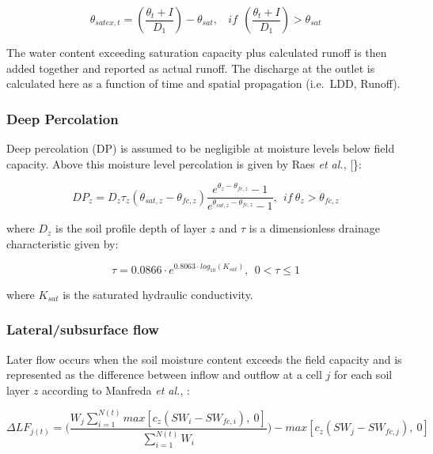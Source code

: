 \documentclass[]{article}
\begin{document}
\begin{equation}
\theta_{satex,t}=(\frac{\theta_t+I}{D_1})-\theta_{sat},  ~~~~if~~(\frac{\theta_t+I}{D_1})>\theta_{sat}
\label{eq:thetat}  
\end{equation}

The water content exceeding saturation capacity plus calculated runoff
is then added together and reported as actual runoff. The discharge at
the outlet is calculated here as a function of time and spatial
propagation (i.e.~LDD, Runoff).

\subsubsection{Deep Percolation}\label{deep-percolation}

Deep percolation (DP) is assumed to be negligible at moisture levels
below field capacity. Above this moisture level percolation is given by
Raes \textit{et al.}, {[}\citet{Raes:2002}\}:

\begin{equation}
DP_z = D_z \tau_z (\theta_{sat, z} - \theta_{fc, z}) \frac{e^{\theta_z-\theta_{fc,z}}-1}{e^{\theta_{sat, z}-\theta_{fc,z}}-1},~~if~ \theta_z > \theta_{fc, z} 
\label{eq:DP}  
\end{equation}

where \(D_z\) is the soil profile depth of layer \(z\) and \(\tau\) is a
dimensionless drainage characteristic given by:

\begin{equation}
\tau = 0.0866 \cdot e^{0.8063 \cdot log_{10}(K_{sat})}, ~~0< \tau \leq 1
\label{eq:tau}  
\end{equation}

where \(K_{sat}\) is the saturated hydraulic conductivity.

\subsubsection{Lateral/subsurface flow}\label{lateralsubsurface-flow}

Later flow occurs when the soil moisture content exceeds the field
capacity and is represented as the difference between inflow and outflow
at a cell \(j\) for each soil layer \(z\) according to Manfreda
\textit{et al.}, \citep{Manfreda2005}:

\begin{equation}
\Delta LF_{j(t)} = \Big( \frac{W_{j} \sum^{N(t)}_{i=1}max[c_{z}(SW_{i}-SW_{fc,i}),~0] }{ \sum^{N(t)}_{i=1} W_{i} } \Big) - max[c_z(SW_j-SW_{fc,j}),~0]
\label{eq:LF}  
\end{equation}
\end{document}
